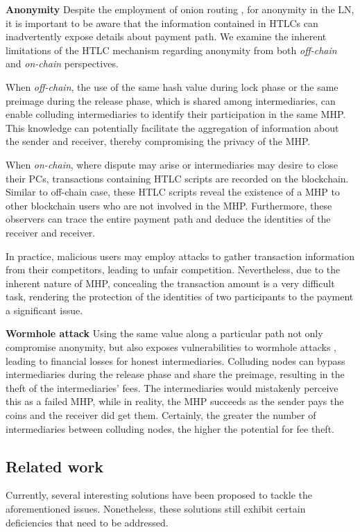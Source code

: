 \documentclass[conference]{IEEEtran}
\begin{document}
\textbf{Anonymity} Despite the employment of onion routing \cite{onion routing}, \cite{sphinx} for anonymity in 
the LN, it is important to be aware that the information contained in HTLCs can inadvertently expose details 
about payment path. We examine the inherent limitations of the HTLC mechanism regarding anonymity 
from both \textit{off-chain} and \textit{on-chain} perspectives. 

When \textit{off-chain}, the use of the same hash value during lock phase or the same preimage during the release phase, 
which is shared among intermediaries, can enable colluding intermediaries to identify their participation in the 
same MHP. This knowledge can potentially facilitate the aggregation of information about the sender and receiver, 
thereby compromising the privacy of the MHP. 

When \textit{on-chain}, where dispute may arise or intermediaries may desire to close their PCs, transactions 
containing HTLC scripts are recorded on the blockchain. Similar to off-chain case, these HTLC scripts reveal the 
existence of a MHP to other blockchain users who are not involved in the MHP. Furthermore, these observers can 
trace the entire payment path and deduce the identities of the receiver and receiver.

In practice, malicious users may employ attacks to gather transaction information from their competitors, leading to 
unfair competition. Nevertheless, due to the inherent nature of MHP, concealing the transaction amount is a very 
difficult task, rendering the protection of the identities of two participants to the payment a significant issue. 


\textbf{Wormhole attack} Using the same value along a particular path not only compromise anonymity, but also exposes 
vulnerabilities to wormhole attacks \cite{amhl}, leading to financial losses for honest intermediaries. Colluding nodes 
can bypass intermediaries during the release phase and share the preimage, resulting in the theft of the intermediaries' 
fees. The intermediaries would mistakenly perceive this as a failed MHP, while in reality, the MHP succeeds as the 
sender pays the coins and the receiver did get them. Certainly, the greater the number of intermediaries between colluding 
nodes, the higher the potential for fee theft.

\subsection{Related work}
Currently, several interesting solutions have been proposed to tackle the aforementioned issues. Nonetheless, these solutions 
still exhibit certain deficiencies that need to be addressed.
\end{document}
